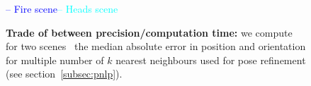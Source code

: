 \begin{figure}
\begin{minipage}{0.65\linewidth}
   		\vspace{0.2cm}
   		
   		\begin{footnotesize}
   				 \hfill\textcolor{blue}{{\Large --} Fire scene}\hfill\textcolor{cyan}{{\Large --} Heads scene}\hfill
   		\end{footnotesize}
   		
   	\end{minipage}\hfill
   	\begin{minipage}{0.35\linewidth}
   		\caption[Influence of the number of kNN]{\textbf{Trade of between precision/computation time:}\label{fig:ratio_t_knn} we compute for two scenes~\citep{Shotton2013} the median absolute error in position and orientation for multiple number of $k$ nearest neighbours used for pose refinement (see section~\ref{subsec:pnlp}). }
   	\end{minipage}	
	
	
	
\end{figure}